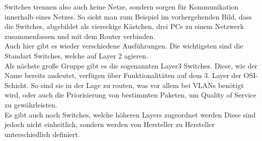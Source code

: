 \documentclass[12pt,a4paper]{report}
\begin{document}
\begin{onehalfspace}
Switches trennen also auch keine Netze, sondern sorgen für Kommunikation innerhalb eines Netzes. So sieht man zum Beispiel im vorhergehenden Bild, dass die Switches, abgebildet als viereckige Kästchen, drei PCs zu einem Netzwerk zusammenfassen und mit dem Router verbinden.\\

Auch hier gibt es wieder verschiedene Ausführungen. Die wichtigsten sind die Standart Switches, welche auf Layer 2 agieren.\\
Als nächste große Gruppe gibt es die sogenannten Layer3 Switches. Diese, wie der Name bereits andeutet, verfügen über Funktionalitäten auf dem 3. Layer der OSI-Schicht. So sind sie in der Lage zu routen, was vor allem bei VLANs benötigt wird, oder auch die Priorisierung von bestimmten Paketen, um Quality of Service zu gewährleisten.\\
Es gibt auch noch Switches, welche höheren Layers zugeordnet werden Diese sind jedoch nicht einheitlich, sondern werden von Hersteller zu Hersteller unterschiedlich definiert.

\end{onehalfspace}
\end{document}
